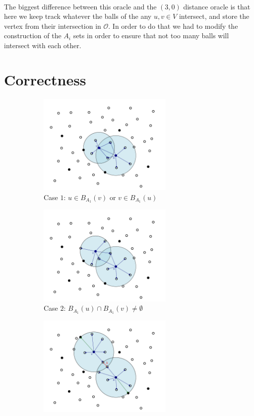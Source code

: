 \documentclass[shortabstract, lic, english]{iithesis}
\theoremstyle{definition} \newtheorem{definition}{Definition}[chapter]
\theoremstyle{plain} \newtheorem{remark}[definition]{Observation}
\theoremstyle{plain} \newtheorem{theorem}[definition]{Theorem}
\theoremstyle{plain} \newtheorem{lemma}[definition]{Lemma}
\theoremstyle{plain} \newtheorem{conjecture}[definition]{Conjecture}
\begin{document}
~

The biggest difference between this oracle and the $(3,0)$ distance oracle
is that here we keep track whatever the balls of the any $u,v \in V$ intersect,
and store the vertex from their intersection in $\mathcal{O}$.
In order to do that we had to modify the construction of the $A_i$ sets in order to
ensure that not too many balls will intersect with each other.

\section{Correctness}

\begin{figure}[H]
    \centering
    \begin{subfigure}[H]{0.465\textwidth}
        \centering
        \includegraphics[width=6.5cm]{images/case_1}
        \caption{Case $1$: $u \in B_{A_1}(v)$ or $v \in B_{A_1}(u)$}
    \end{subfigure}\hfill%
    \begin{subfigure}[H]{0.465\textwidth}
        \centering
        \includegraphics[width=6.5cm]{images/case_2}
        \caption{Case $2$: $B_{A_1}(u) \cap B_{A_1}(v) \neq \emptyset$}
    \end{subfigure}
    \begin{subfigure}[H]{0.465\textwidth}
        \centering
        \includegraphics[width=6.5cm]{images/case_3_worst}

\end{subfigure}
\end{figure}
\end{document}
